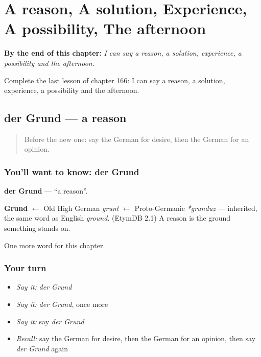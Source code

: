 
\chapter{A reason, A solution, Experience, A possibility, The afternoon}
\label{ch:ge-a-reason-a-solution-experience-a-possibility-the-afternoon}

\begin{chapteropening}
\textbf{By the end of this chapter:} \emph{I can say a reason, a solution, experience, a possibility and the afternoon.}

Complete the last lesson of chapter 166: I can say a reason, a solution, experience, a possibility and the afternoon.
\end{chapteropening}

\section[der Grund]{der Grund — a reason}

\label{lesson:GE-C166-grund}



\begin{quote}
Before the new one: say the German for desire, then the German for an opinion.
\end{quote}

\subsection*{You'll want to know: der Grund}
\textbf{der Grund} — \textquotedblleft{}a reason\textquotedblright{}.

\begin{cousinweb}
\textbf{Grund} $\leftarrow$ Old High German \emph{grunt} $\leftarrow$ Proto-Germanic \emph{*grunduz} — inherited, the same word as English \emph{ground}. (EtymDB 2.1) A reason is the ground something stands on.
\end{cousinweb}

\begin{grammarlens}[title={What you've built}]
One more word for this chapter.
\end{grammarlens}

\subsection*{Your turn}
\begin{itemize}
\raggedright
  \item \emph{Say it:} \emph{der Grund}
  \item \emph{Say it:} \emph{der Grund}, once more
  \item \emph{Say it:} say \emph{der Grund}
  \item \emph{Recall:} say the German for desire, then the German for an opinion, then say \emph{der Grund} again
\end{itemize}

